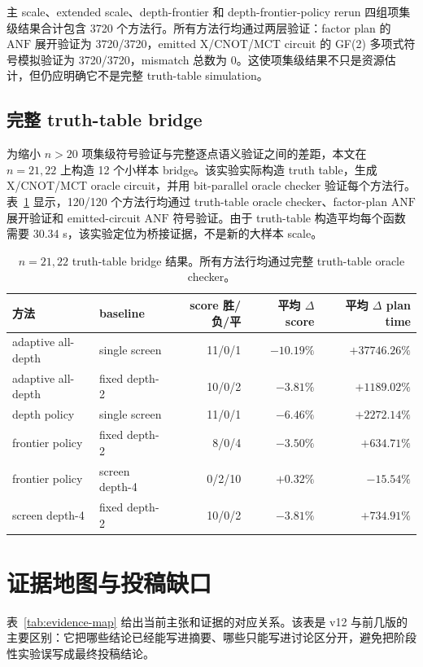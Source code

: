 \documentclass[UTF8,fontset=macnew,11pt]{ctexart}
\newcommand{\anf}{\ensuremath{\mathrm{ANF}}}
\newcommand{\ttable}{truth-table}
\begin{document}
主 scale、extended scale、depth-frontier 和 depth-frontier-policy rerun 四组项集级结果合计包含 3720 个方法行。所有方法行均通过两层验证：factor plan 的 \anf{} 展开验证为 3720/3720，emitted X/CNOT/MCT circuit 的 GF(2) 多项式符号模拟验证为 3720/3720，mismatch 总数为 0。这使项集级结果不只是资源估计，但仍应明确它不是完整 \ttable{} simulation。

\subsection{完整 truth-table bridge}

为缩小 $n>20$ 项集级符号验证与完整逐点语义验证之间的差距，本文在 $n=21,22$ 上构造 12 个小样本 bridge。该实验实际构造 truth table，生成 X/CNOT/MCT oracle circuit，并用 bit-parallel oracle checker 验证每个方法行。表~\ref{tab:truth-bridge} 显示，120/120 个方法行均通过 truth-table oracle checker、factor-plan \anf{} 展开验证和 emitted-circuit \anf{} 符号验证。由于 truth-table 构造平均每个函数需要 30.34 s，该实验定位为桥接证据，不是新的大样本 scale。

\begin{table}[H]
\centering
\scriptsize
\caption{$n=21,22$ truth-table bridge 结果。所有方法行均通过完整 truth-table oracle checker。}
\label{tab:truth-bridge}
\begin{tabular}{llrrr}
\toprule
方法 & baseline & score 胜/负/平 & 平均 $\Delta$ score & 平均 $\Delta$ plan time \\
\midrule
adaptive all-depth & single screen & 11/0/1 & $-10.19\%$ & $+37746.26\%$ \\
adaptive all-depth & fixed depth-2 & 10/0/2 & $-3.81\%$ & $+1189.02\%$ \\
depth policy & single screen & 11/0/1 & $-6.46\%$ & $+2272.14\%$ \\
frontier policy & fixed depth-2 & 8/0/4 & $-3.50\%$ & $+634.71\%$ \\
frontier policy & screen depth-4 & 0/2/10 & $+0.32\%$ & $-15.54\%$ \\
screen depth-4 & fixed depth-2 & 10/0/2 & $-3.81\%$ & $+734.91\%$ \\
\bottomrule
\end{tabular}
\end{table}

\section{证据地图与投稿缺口}

表~\ref{tab:evidence-map} 给出当前主张和证据的对应关系。该表是 v12 与前几版的主要区别：它把哪些结论已经能写进摘要、哪些只能写进讨论区分开，避免把阶段性实验误写成最终投稿结论。
\end{document}
